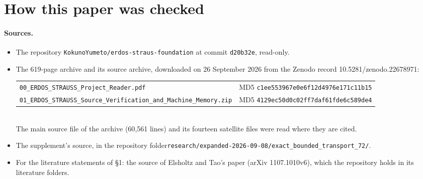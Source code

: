 \section{How this paper was checked}\label{app:verification}

\paragraph{Sources.}
\begin{itemize}
\item The repository \texttt{KokunoYumeto/erdos-straus-foundation} at commit \texttt{d20b32e}, read-only.
\item The 619-page archive and its source archive, downloaded on 26 September 2026 from the Zenodo record 10.5281/zenodo.22678971:\\[2pt]
{\footnotesize\begin{tabular}{@{}ll@{}}
\texttt{00\_ERDOS\_STRAUSS\_Project\_Reader.pdf} & MD5 \texttt{c1ee553967e0e6f12d4976e171c11b15}\\
\texttt{01\_ERDOS\_STRAUSS\_Source\_Verification\_and\_Machine\_Memory.zip} & MD5 \texttt{4129ec50d0c02ff7daf61fde6c589de4}
\end{tabular}}\\[2pt]
The main source file of the archive (60{,}561 lines) and its fourteen satellite files were read where they are cited.
\item The supplement's source, in the repository folder\newline \texttt{research/expanded-2026-09-08/exact\_bounded\_transport\_72/}.
\item For the literature statements of §1: the source of Elsholtz and Tao's paper (arXiv 1107.1010v6), which the repository holds in its literature folders.
\end{itemize}


